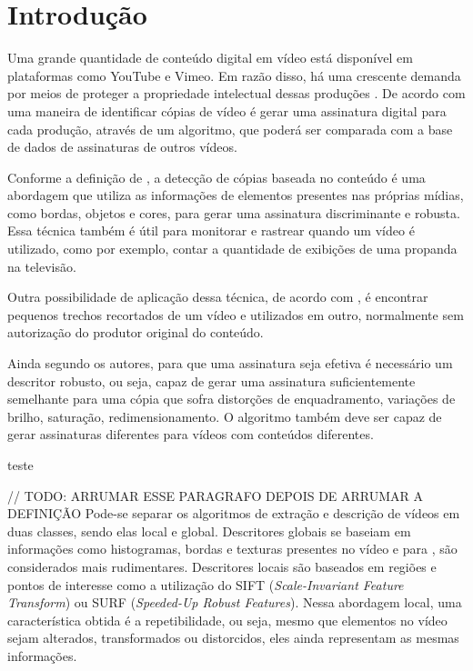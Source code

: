 
\chapter{Introdução}
\label{chap:introducao}


Uma grande quantidade de conteúdo digital em vídeo está disponível em plataformas como YouTube e Vimeo. Em razão disso, há uma crescente demanda por meios de proteger a propriedade intelectual dessas produções \cite{hua2004robust}. De acordo com \cite{kim2005spatiotemporal} uma maneira de identificar cópias de vídeo é gerar uma assinatura digital para cada produção, através de um algoritmo, que poderá ser comparada com a base de dados de assinaturas de outros vídeos.

	Conforme a definição de \cite{kim2005spatiotemporal}, a detecção de cópias baseada no conteúdo é uma abordagem que utiliza as informações de elementos presentes nas próprias mídias, como bordas, objetos e cores, para gerar uma assinatura discriminante e robusta. Essa técnica também é útil para monitorar e rastrear quando um vídeo é utilizado, como por exemplo, contar a quantidade de exibições de uma propanda na televisão. 
    
    Outra possibilidade de aplicação dessa técnica, de acordo com \cite{chen2008video}, é encontrar pequenos trechos recortados de um vídeo e utilizados em outro, normalmente sem autorização do produtor original do conteúdo.

    Ainda segundo os autores, para que uma assinatura seja efetiva é necessário um descritor robusto, ou seja, capaz de gerar uma assinatura suficientemente semelhante para uma cópia que sofra distorções de enquadramento, variações de brilho, saturação, redimensionamento. O algoritmo também deve ser capaz de gerar assinaturas diferentes para vídeos com conteúdos diferentes. 
    
    teste \citeauthor{mao2015sceneframe}

    // TODO: ARRUMAR ESSE PARAGRAFO DEPOIS DE ARRUMAR A DEFINIÇÃO Pode-se separar os algoritmos de extração e descrição de vídeos em duas classes, sendo elas local e global. Descritores globais se baseiam em informações como histogramas, bordas e texturas presentes no vídeo e para \cite{santos2004segmentaccao}, são considerados mais rudimentares.  Descritores locais são baseados em regiões e pontos de interesse como a utilização do SIFT (\textit{Scale-Invariant Feature Transform}) ou SURF (\textit{Speeded-Up Robust Features}). Nessa abordagem local, uma característica obtida é a repetibilidade, ou seja, mesmo que elementos no vídeo sejam alterados, transformados ou distorcidos, eles ainda representam as mesmas informações.
    
